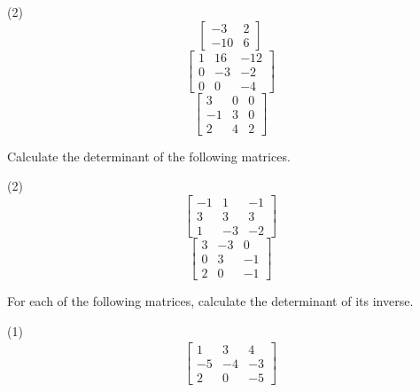 \begin{tasks}[resume, style=enumerate](2)
\task
  \begin{displaymath}
    \begin{bmatrix}
      -3 & 2 \\
      -10 & 6
    \end{bmatrix}
  \end{displaymath}
\task
  \begin{displaymath}
    \begin{bmatrix}
      1 & 16 & -12 \\
      0 & -3 & -2 \\
      0 & 0 & -4
    \end{bmatrix}
  \end{displaymath}
\task
  \begin{displaymath}
    \begin{bmatrix}
      3 & 0 & 0 \\
      -1 & 3 & 0 \\
      2 & 4 & 2
    \end{bmatrix}
  \end{displaymath}
\end{tasks}
Calculate the determinant of the following matrices.
\begin{tasks}[resume, style=enumerate](2)
\task
  \begin{displaymath}
    \begin{bmatrix}
      -1 & 1 & -1 \\
      3 & 3 & 3 \\
      1 & -3 & -2
    \end{bmatrix}
  \end{displaymath}
\task
  \begin{displaymath}
    \begin{bmatrix}
      3 & -3 & 0 \\
      0 & 3 & -1 \\
      2 & 0 & -1
    \end{bmatrix}
  \end{displaymath}
\end{tasks}
For each of the following matrices, calculate the determinant of its
inverse.
\begin{tasks}[resume, style=enumerate](1)
\task
  \begin{align*}
    \begin{bmatrix}
      1 & 3 & 4 \\
      -5 & -4 & -3 \\
      2 & 0 & -5
    \end{bmatrix}
  \end{align*}
\end{tasks}
